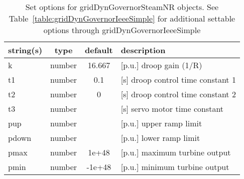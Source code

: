 \begin{table}[ht]
\centering
\begin{tabular}{p{5cm} c c p{7cm}}
\hline
string(s) & type & default & description \\
\hline
k & number & 16.667 & [p.u.] droop gain (1/R)\\
t1 & number & 0.1 & [s]   droop control time constant 1\\
t2 & number & 0 & [s]   droop control  time constant 2\\
t3 & number &  & [s]    servo motor time constant\\
pup & number &  & [p.u.] upper ramp limit\\
pdown & number &  & [p.u.] lower ramp limit\\
pmax & number & 1e+48 & [p.u.] maximum turbine output\\
pmin & number & -1e+48 & [p.u.] minimum turbine output\\
\hline
\end{tabular}
\caption{Set options for gridDynGovernorSteamNR objects. See Table~\ref{table:gridDynGovernorIeeeSimple} for additional settable options through gridDynGovernorIeeeSimple}
\label{table:gridDynGovernorSteamNR}
\end{table}
